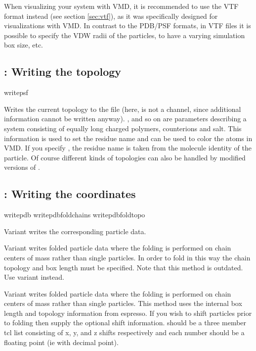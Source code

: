 When visualizing your system with VMD, it is recommended to use the
VTF format instead (see section \ref{sec:vtf}), as it was specifically
designed for visualizations with VMD. In contrast to the PDB/PSF
formats, in VTF files it is possible to specify the VDW radii of the
particles, to have a varying simulation box size, etc.

\subsection{: Writing the topology}

\begin{essyntax}
  writepsf     
   
\end{essyntax}
Writes the current topology to the file  (here, 
is not a channel, since additional information cannot be written
anyway).  ,  and so on are parameters describing a
system consisting of equally long charged polymers, counterions and
salt.  This information is used to set the residue name and can be
used to color the atoms in VMD. If you specify , the
residue name is taken from the molecule identity of the particle. Of
course different kinds of topologies can also be handled by modified
versions of .


\subsection{: Writing the coordinates}

\begin{essyntax}
   writepdb 
   writepdbfoldchains  
    
   writepdbfoldtopo  
\end{essyntax}

Variant  writes the corresponding particle data. 

Variant  writes folded particle data where the folding is
performed on chain centers of mass rather than single particles. In
order to fold in this way the chain topology and box length must be
specified.  Note that this method is outdated. Use variant 
instead.

Variant  writes folded particle data where the folding is
performed on chain centers of mass rather than single particles. This
method uses the internal box length and topology information from
espresso. If you wish to shift particles prior to folding then supply
the optional shift information.  should be a three member
tcl list consisting of x, y, and z shifts respectively and each number
should be a floating point (ie with decimal point).


